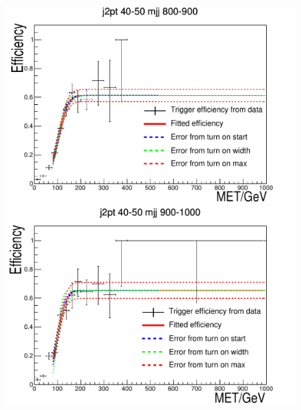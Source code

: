 \begin{figure}[h!]
  \begin{center}
    \includegraphics[width=.6\largefigwidth]{plots/parked/trigfitplots/hData_MET_1D_23BC.pdf}
    \includegraphics[width=.6\largefigwidth]{plots/parked/trigfitplots/hData_MET_1D_24BC.pdf}


\end{center}
\end{figure}
